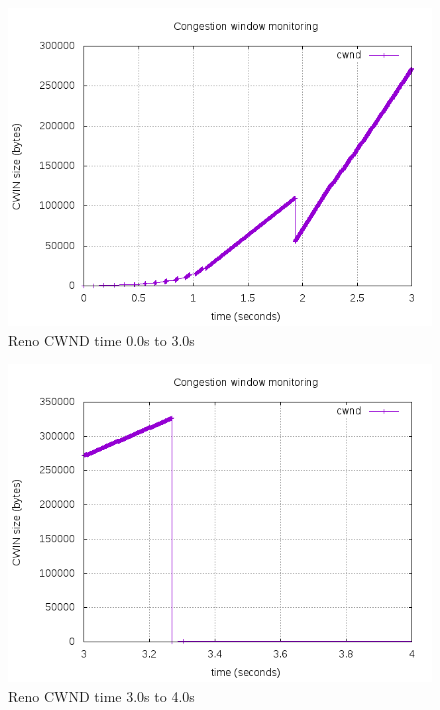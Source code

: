 \documentclass{article}
\begin{document}
\begin{figure}[H]
\centering
 \includegraphics[width=12cm]{figures/cwndReno_1.png}
\caption{Reno CWND time 0.0s to 3.0s}
\end{figure}



\begin{figure}[H]
\centering
 \includegraphics[width=12cm]{figures/cwndReno_2.png}
\caption{Reno CWND time 3.0s to 4.0s}
\end{figure}
\end{document}
